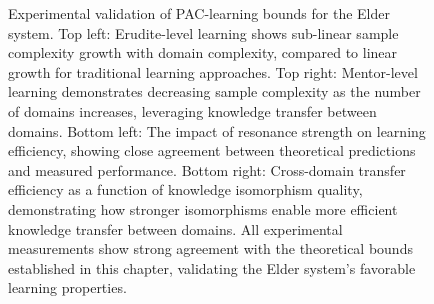 \begin{figure}[htbp]
\caption{Experimental validation of PAC-learning bounds for the Elder system. Top left: Erudite-level learning shows sub-linear sample complexity growth with domain complexity, compared to linear growth for traditional learning approaches. Top right: Mentor-level learning demonstrates decreasing sample complexity as the number of domains increases, leveraging knowledge transfer between domains. Bottom left: The impact of resonance strength on learning efficiency, showing close agreement between theoretical predictions and measured performance. Bottom right: Cross-domain transfer efficiency as a function of knowledge isomorphism quality, demonstrating how stronger isomorphisms enable more efficient knowledge transfer between domains. All experimental measurements show strong agreement with the theoretical bounds established in this chapter, validating the Elder system's favorable learning properties.}
\label{fig:pac_experimental}
\end{figure}
